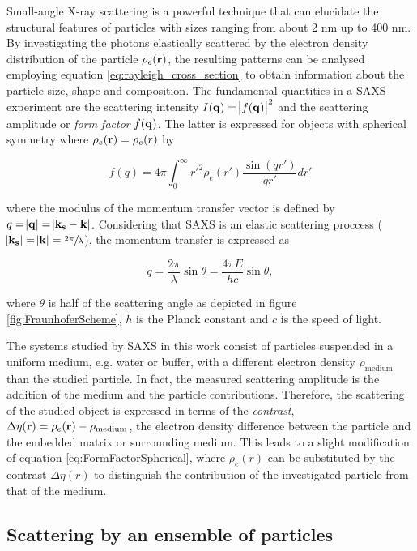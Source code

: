 Small-angle X-ray scattering is a powerful technique that can elucidate the structural features of particles with sizes ranging from about 2 nm up to 400 nm. By investigating the photons elastically scattered by the electron density distribution of the particle $\rho_e ( \boldsymbol{\mathbf{r}} )$, the resulting patterns can be analysed employing equation \ref{eq:rayleigh_cross_section} to obtain information about the particle size, shape and composition. The fundamental quantities in a SAXS experiment are the scattering intensity $I(\boldsymbol{\mathbf{q}}) = \abs{f(\boldsymbol{\mathbf{q}})}^2$ and the scattering amplitude or \emph{form factor} $f(\boldsymbol{\mathbf{q}})$. The latter is expressed for objects with spherical symmetry where $\rho_e(\boldsymbol{\mathbf{r}})=\rho_e(r)$ by

\begin{equation}
        \label{eq:FormFactorSpherical}
        f(q)=4\pi \int_0^{\infty} r'^2 \rho_e(r')  \frac{\sin(qr')}{qr'}  dr'
\end{equation}

where the modulus of the momentum transfer vector is defined by $q=\abs{\boldsymbol{\mathbf{q}}}=\abs{\boldsymbol{\mathbf{k_s}} - \boldsymbol{\mathbf{k}}}$. Considering that SAXS is an elastic scattering proccess ($\abs{\boldsymbol{\mathbf{k_s}}}=\abs{\boldsymbol{\mathbf{k}}}=\sfrac{2\pi}{\lambda}$), the momentum transfer is expressed as

\begin{equation}
q=\frac{2\pi }{\lambda}\sin\theta=\frac{4\pi E}{h c}\sin\theta ,
\end{equation}

where \(\theta\) is half of the scattering angle as depicted in figure \ref{fig:FraunhoferScheme}, \(h\) is the Planck constant and \(c\) is the speed of light.

The systems studied by SAXS in this work consist of particles suspended in a uniform medium, e.g. water or buffer, with a different electron density $\rho_{\text{medium}}$ than the studied particle. In fact, the measured scattering amplitude is the addition of the medium and the particle contributions. Therefore, the scattering of the studied object is expressed in terms of the \emph{contrast}, $\Delta \eta (\boldsymbol{\mathbf{r}}) = \rho_e(\boldsymbol{\mathbf{r}}) - \rho_{\text{medium}}$, the electron density difference between the particle and the embedded matrix or surrounding medium. This leads to a slight modification of equation \ref{eq:FormFactorSpherical}, where $\rho_e(r)$ can be substituted by the contrast $\Delta\eta(r)$ to distinguish the contribution of the investigated particle from that of the medium.

\subsection{Scattering by an ensemble of particles}

